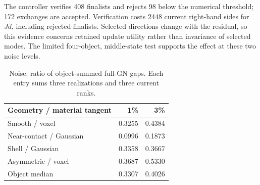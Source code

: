 The controller verifies 408 finalists and rejects 98 below the numerical threshold; 172 exchanges are accepted. Verification costs 2448 current right-hand sides for $Jd$, including rejected finalists. Selected directions change with the residual, so this evidence concerns retained update utility rather than invariance of selected modes. The limited four-object, middle-state test supports the effect at these two noise levels.

\begin{table}[t]\centering\caption{Noise: ratio of object-summed full-GN gaps. Each entry sums three realizations and three current ranks.}\label{tab:noise}
\begin{tabular}{lrr}\toprule
Geometry / material tangent&1\%&3\%\\\midrule
Smooth / voxel&0.3255&0.4384\\
Near-contact / Gaussian&0.0996&0.1873\\
Shell / Gaussian&0.3358&0.3667\\
Asymmetric / voxel&0.3687&0.5330\\\midrule
Object median&0.3307&0.4026\\\bottomrule
\end{tabular}
\end{table}



